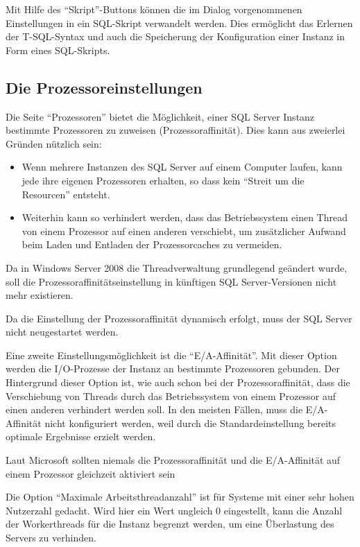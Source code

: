         Mit Hilfe des \enquote{Skript}-Buttons können die im Dialog
        vorgenommenen Einstellungen in ein SQL-Skript verwandelt werden. Dies
        ermöglicht das Erlernen der T-SQL-Syntax und auch die Speicherung der
        Konfiguration einer Instanz in Form eines SQL-Skripts.
      \subsection{Die Prozessoreinstellungen}
        Die Seite \enquote{Prozessoren} bietet die Möglichkeit, einer SQL
        Server Instanz bestimmte Prozessoren zu zuweisen (Prozessoraffinität).
        Dies kann aus zweierlei Gründen nützlich sein:
        \begin{itemize}
            \item Wenn mehrere Instanzen des SQL Server auf einem Computer
            laufen, kann jede ihre eigenen Prozessoren erhalten, so dass kein
            \enquote{Streit um die Resourcen} entsteht.
            \item Weiterhin kann so verhindert werden, dass das Betriebssystem
            einen Thread von einem Prozessor auf einen anderen verschiebt,
            um zusätzlicher Aufwand beim Laden und Entladen der Prozessorcaches
            zu vermeiden.
        \end{itemize} 
        \begin{merke}
          Da in Windows Server 2008 die Threadverwaltung grundlegend geändert
          wurde, soll die Prozessoraffinitätseinstellung in künftigen SQL
          Server-Versionen nicht mehr existieren.
        \end{merke}
        Da die Einstellung der Prozessoraffinität dynamisch erfolgt, muss der
        SQL Server nicht neugestartet werden.
        \begin{literaturinternet}
          \item \cite{ms187104}
        \end{literaturinternet}          
        
        Eine zweite Einstellungsmöglichkeit ist die \enquote{E/A-Affinität}.
        Mit dieser Option werden die I/O-Prozesse der Instanz an bestimmte
        Prozessoren gebunden. Der Hintergrund dieser Option ist, wie auch schon
        bei der Prozessoraffinität, dass die Verschiebung von Threads durch das
        Betriebssystem von einem Prozessor auf einen anderen verhindert werden
        soll. In den meisten Fällen, muss die E/A-Affinität nicht konfiguriert
        werden, weil durch die Standardeinstellung bereits optimale Ergebnisse
        erzielt werden.
        \begin{merke}
          Laut Microsoft sollten niemals die Prozessoraffinität und die
          E/A-Affinität auf einem Prozessor gleichzeit aktiviert sein
        \end{merke}
        Die Option \enquote{Maximale Arbeitsthreadanzahl} ist für Systeme mit
        einer sehr hohen Nutzerzahl gedacht. Wird hier ein Wert ungleich 0
        eingestellt, kann die Anzahl der Workerthreads für die Instanz
        begrenzt werden, um eine Überlastung des Servers zu verhinden.
        
